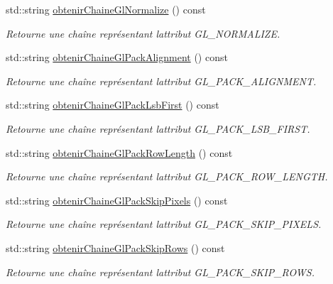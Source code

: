 \begin{DoxyCompactItemize}
std\+::string \hyperlink{group__utilitaire_gab8f8c7f8e749817f94751308b2344af4}{obtenir\+Chaine\+Gl\+Normalize} () const 
\begin{DoxyCompactList}\small\item\em Retourne une chaîne représentant l\textquotesingle{}attribut G\+L\+\_\+\+N\+O\+R\+M\+A\+L\+I\+Z\+E. \end{DoxyCompactList}\item 
std\+::string \hyperlink{group__utilitaire_ga7b46757dfa6068f0833baab8d98d2c2a}{obtenir\+Chaine\+Gl\+Pack\+Alignment} () const 
\begin{DoxyCompactList}\small\item\em Retourne une chaîne représentant l\textquotesingle{}attribut G\+L\+\_\+\+P\+A\+C\+K\+\_\+\+A\+L\+I\+G\+N\+M\+E\+N\+T. \end{DoxyCompactList}\item 
std\+::string \hyperlink{group__utilitaire_ga49cc9b47a26f144e0651b4679752a02c}{obtenir\+Chaine\+Gl\+Pack\+Lsb\+First} () const 
\begin{DoxyCompactList}\small\item\em Retourne une chaîne représentant l\textquotesingle{}attribut G\+L\+\_\+\+P\+A\+C\+K\+\_\+\+L\+S\+B\+\_\+\+F\+I\+R\+S\+T. \end{DoxyCompactList}\item 
std\+::string \hyperlink{group__utilitaire_ga64b0337d0f84557f6f8661ec6e03e154}{obtenir\+Chaine\+Gl\+Pack\+Row\+Length} () const 
\begin{DoxyCompactList}\small\item\em Retourne une chaîne représentant l\textquotesingle{}attribut G\+L\+\_\+\+P\+A\+C\+K\+\_\+\+R\+O\+W\+\_\+\+L\+E\+N\+G\+T\+H. \end{DoxyCompactList}\item 
std\+::string \hyperlink{group__utilitaire_gadb44f6347d29047a0a3789c51f4913f6}{obtenir\+Chaine\+Gl\+Pack\+Skip\+Pixels} () const 
\begin{DoxyCompactList}\small\item\em Retourne une chaîne représentant l\textquotesingle{}attribut G\+L\+\_\+\+P\+A\+C\+K\+\_\+\+S\+K\+I\+P\+\_\+\+P\+I\+X\+E\+L\+S. \end{DoxyCompactList}\item 
std\+::string \hyperlink{group__utilitaire_ga13b70d48642c0b921c0497f1ed7e88fa}{obtenir\+Chaine\+Gl\+Pack\+Skip\+Rows} () const 
\begin{DoxyCompactList}\small\item\em Retourne une chaîne représentant l\textquotesingle{}attribut G\+L\+\_\+\+P\+A\+C\+K\+\_\+\+S\+K\+I\+P\+\_\+\+R\+O\+W\+S. \end{DoxyCompactList}\item 

\end{DoxyCompactItemize}
